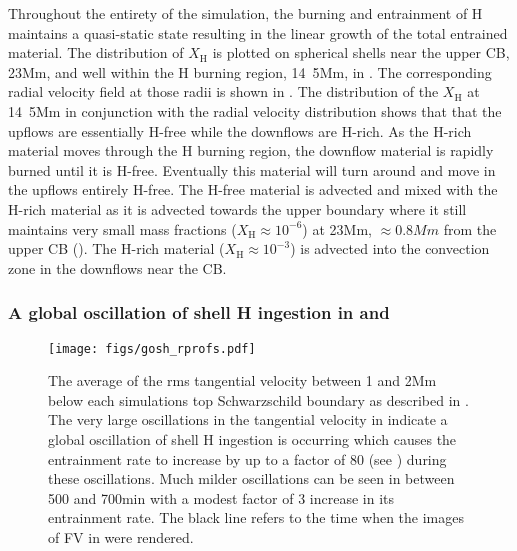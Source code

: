 \documentclass[fleqn,usenatbib]{mnras}
\begin{document}
Throughout the entirety of the  simulation, the burning and
entrainment of H maintains a quasi-static state resulting in the linear
growth of the total entrained material. The distribution of $X_{\mathrm{H}}$ is
plotted on spherical shells near the upper CB, \unit{23}{Mm}, and well within
the H burning region, \unit{14.5}{Mm}, in . The corresponding
radial velocity field at those radii is shown in . The
distribution of the $X_{\mathrm{H}}$ at \unit{14.5}{Mm} in conjunction with the
radial velocity distribution shows that that the upflows are essentially H-free
while the downflows are H-rich. As the H-rich material moves through the H
burning region, the downflow material is rapidly burned until it is H-free.
Eventually this material will turn around and move in the upflows entirely
H-free. The H-free material is advected and mixed with the H-rich material as it
is advected towards the upper boundary where it still maintains very small mass
fractions ($X_{\mathrm{H}} \approx 10^{-6}$) at \unit{23}{Mm}, $\approx
\unit{0.8}{Mm}$ from the upper CB (). The H-rich material
($X_{\mathrm{H}} \approx 10^{-3}$) is advected into the convection zone in the
downflows near the CB.

\subsubsection{A global oscillation of shell H ingestion in  and }
\label{sec:goshruns}

\begin{figure}

  \texttt{[image: figs/gosh\_rprofs.pdf]}
  \centering
  \caption{The average of the rms tangential velocity between 1 and \unit{2}{Mm}
          below each simulations top Schwarzschild boundary as described in
          . The very large oscillations in the tangential velocity
          in  indicate a global oscillation of shell H ingestion is occurring which causes the entrainment rate to
          increase by up to a factor of 80 (see ) during these oscillations.
          Much milder oscillations can be seen in  between 500 and
          \unit{700}{min} with a modest factor of 3 increase in its entrainment rate. The
          black line refers to the time when the images of FV in  were
          rendered.}
  \label{fig:goshrprofs}

\end{figure}
\end{document}
